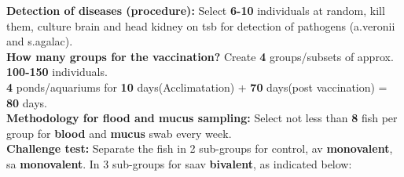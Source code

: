 \textbf{Detection of diseases (procedure):} Select \textbf{6-10} individuals at random, kill them, culture brain and head kidney on \ac{tsb} for detection of pathogens (\ac{a.veronii} and \ac{s.agalac}). \\

\textbf{How many groups for the vaccination?}  Create \textbf{4} groups/subsets of approx. \textbf{100-150} individuals. \\
    \textbf{4} ponds/aquariums for \textbf{10} days(Acclimatation) + \textbf{70} days(post vaccination) = \textbf{80} days. \\
  
\textbf{Methodology for flood and mucus sampling:} Select not less than \textbf{8} fish per group for \textbf{blood} and \textbf{mucus} swab every week. \\

\textbf{Challenge test:} Separate the fish in 2 sub-groups for \ac{control}, \ac{av} \textbf{monovalent}, \ac{sa} \textbf{monovalent}. In 3 sub-groups for \ac{saav} \textbf{bivalent}, as indicated below: \\
\newpage


